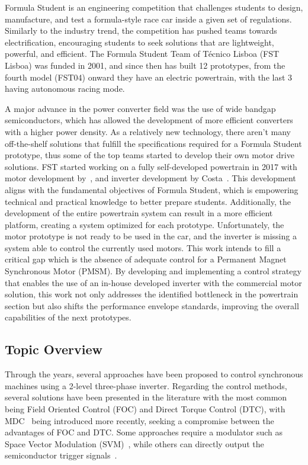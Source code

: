 \documentclass[9pt,conference]{IEEEtran}
\begin{document}
Formula Student is an engineering competition that challenges students to design, manufacture, and test a formula-style race car inside a given set of regulations. Similarly to the industry trend, the competition has pushed teams towards electrification, encouraging students to seek solutions that are lightweight, powerful, and efficient. The Formula Student Team of Técnico Lisboa (FST Lisboa) was funded in 2001, and since then has built 12 prototypes, from the fourth model (FST04) onward they have an electric powertrain, with the last 3 having autonomous racing mode.

A major advance in the power converter field was the use of wide bandgap semiconductors, which has allowed the development of more efficient converters with a higher power density. As a relatively new technology, there aren't many off-the-shelf solutions that fulfill the specifications required for a Formula Student prototype, thus some of the top teams started to develop their own motor drive solutions\@. FST started working on a fully self-developed powertrain in 2017 with motor development by~\citet{Sarrico:MSc}, and inverter development by Costa~\cite{Costa:MSc}. This development aligns with the fundamental objectives of Formula Student, which is empowering technical and practical knowledge to better prepare students. Additionally, the development of the entire powertrain system can result in a more efficient platform, creating a system optimized for each prototype. Unfortunately, the motor prototype is not ready to be used in the car, and the inverter is missing a system able to control the currently used motors. This work intends to fill a critical gap which is the absence of adequate control for a Permanent Magnet Synchronous Motor (PMSM). By developing and implementing a control strategy that enables the use of an in-house developed inverter with the commercial motor solution, this work not only addresses the identified bottleneck in the powertrain section but also shifts the performance envelope standards, improving the overall capabilities of the next prototypes.
\subsection{Topic Overview}
Through the years, several approaches have been proposed to control synchronous machines using a 2-level three-phase inverter. Regarding the control methods, several solutions have been presented in the literature with the most common being Field Oriented Control (FOC) and Direct Torque Control (DTC), with MDC~\cite{Bianchi:control_review} being introduced more recently, seeking a compromise between the advantages of FOC and DTC. Some approaches require a modulator such as Space Vector Modulation (SVM)~\cite{Neacsu:SVM_intro:2001:IECON}, while others can directly output the semiconductor trigger signals~\cite{Vazquez:MPC_in_power_systems_review:2017:IEEE}.
\end{document}

